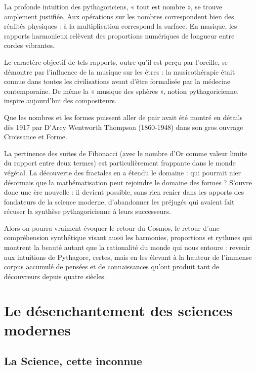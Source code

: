 \documentclass[a4paper,12pt]{article}
\begin{document}
	La profonde intuition des pythagoriciens, « tout est nombre », se trouve amplement justifiée. Aux opérations sur les nombres correspondent bien des réalités physiques : à la multiplication correspond la surface. En musique, les rapports harmonieux relèvent des proportions numériques de longueur entre cordes vibrantes. 
  
  Le caractère objectif de tels rapports, outre qu’il est perçu par l’oreille, se démontre par l’influence de la musique sur les êtres : la musicothérapie était connue dans toutes les civilisations avant d’être formalisée par la médecine contemporaine. De même la « musique des sphères », notion pythagoricienne, inspire aujourd’hui des compositeurs. 
  
  Que les nombres et les formes puissent aller de pair avait été montré en détails dès 1917 par D’Arcy Wentworth Thompson (1860-1948) dans son gros ouvrage Croissance et Forme. 
  
  La pertinence des suites de Fibonacci (avec le nombre d’Or comme valeur limite du rapport entre deux termes) est particulièrement frappante dans le monde végétal. La découverte des fractales en a étendu le domaine : qui pourrait nier désormais que la mathématisation peut rejoindre le domaine des formes ? 
	S’ouvre donc une ère nouvelle : il devient possible, sans rien renier dans les apports des fondateurs de la science moderne, d’abandonner les préjugés qui avaient fait récuser la synthèse pythagoricienne à leurs successeurs. 
  
  Alors on pourra vraiment évoquer le retour du Cosmos, le retour d’une compréhension synthétique visant aussi les harmonies, proportions et rythmes qui montrent la beauté autant que la rationalité du monde qui nous entoure : revenir aux intuitions de Pythagore, certes, mais en les élevant à la hauteur de l’immense corpus accumulé de pensées et de connaissances qu’ont produit tant de découvreurs depuis quatre siècles. 









\section{Le désenchantement des sciences modernes}


\subsection{La Science, cette inconnue}
\end{document}
